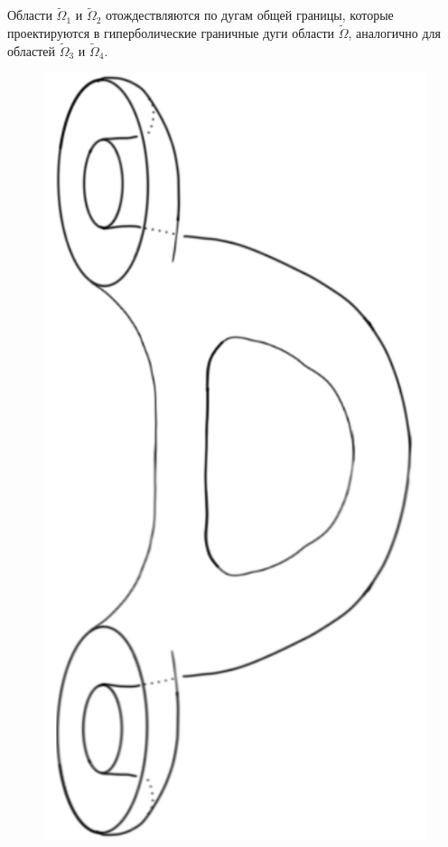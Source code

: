 Области $\widetilde{\Omega}_1$ и $\widetilde{\Omega}_2$ отождествляются по дугам общей границы, которые проектируются в гиперболические граничные дуги области $\widetilde{\Omega}$, аналогично для областей $\widetilde{\Omega}_3$ и $\widetilde{\Omega}_4$. 
\begin{figure}[!htb]
\centering
\includegraphics[scale=0.2]{images/ch4/section2/atoms/atom_3_step.pdf}

\end{figure}
